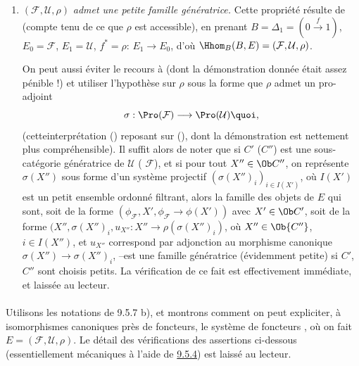 \begin{enumerate}
\item $(\mathcal{F},\mathcal{U},\rho)$ \emph{admet une petite famille
génératrice.} Cette propriété résulte de  (compte tenu de
ce que $\rho$ est accessible), en prenant
$B=\Delta_1=(0\xrightarrow{f}1)$, $E_0=\mathcal{F}$,
$E_{1}=\mathcal{U}$, $f^{\ast}=\rho$: $E_1\rightarrow E_0$, d'où
$\Hhom_B(B,E)=(\mathcal{F},\mathcal{U},\rho)$.

On peut aussi éviter le recours à  (dont la démonstration
donnée était assez pénible !) et utiliser l'hypothèse sur $\rho$
sous la forme que $\rho$ admet un pro-adjoint
$$
\sigma:\Pro(\mathcal{F})\longrightarrow \Pro(\mathcal{U}){\quoi},
$$
(cette\pageoriginale interprétation () reposant sur
(), dont la démonstration est nettement plus
compréhensible). Il suffit alors de noter que si $C'$ (\resp $C''$)
est une sous-catégorie génératrice de $\mathcal{U}$ (\resp
$\mathcal{F}$), et si pour tout $X''\in \Ob C''$, on représente
$\sigma(X'')$ sous forme d'un système projectif
$(\sigma(X'')_i)_{i\in I(X')}$, où $I(X')$ est un petit ensemble
ordonné filtrant, alors la famille des objets de $E$ qui sont, soit
de la forme $(\phi_{\mathcal{F}}, X',\phi_{\mathcal{F}}\rightarrow
\phi(X'))$ avec $X'\in \Ob C'$, soit de la forme $(X'',\sigma
(X'')_i, u_{X''}:X''\rightarrow \rho(\sigma (X'')_i)$, où $X''\in \Ob
{C''}$, $i\in I (X'')$, et $u_{X''}$ correspond par adjonction au
morphisme canonique $\sigma(X'')\rightarrow \sigma (X'')_i$, --est
une famille génératrice (évidemment petite) si $C'$, $C''$ sont
choisis petits. La vérification de ce fait est effectivement
immédiate, et laissée au lecteur.
\end{enumerate}

\setcounter{subsubsection}{4} \setcounter{paragraph}{7}
\paragraph{}
Utilisons les notations de 9.5.7 b), et montrons comment on peut
expliciter, à isomorphismes canoniques près de foncteurs, le système
de foncteurs , où on fait
$E=(\mathcal{F},\mathcal{U},\rho)$. Le détail des vérifications des
assertions ci-dessous (essentiellement mécaniques à l'aide de
\hyperref[IV.theo9.5.4]{9.5.4}) est laissé au lecteur.

\setcounter{subsubsection}{8} \setcounter{paragraph}{0}
